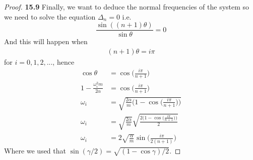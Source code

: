 \documentclass[11pt]{article}
\theoremstyle{definition}
\begin{document}
\begin{proof}{\textbf{15.9}}
    Finally, we want to deduce the normal frequencies of the system so we need
    to solve the equation $\Delta_n = 0$ i.e.
    $$\frac{\sin((n+1)\theta)}{\sin\theta} = 0$$
    And this will happen when
    \begin{align*}
        (n+1)\theta = i\pi
    \end{align*}
    for $i = 0,1,2,...$, hence
    \begin{align*}
        \cos\theta &= \cos\bigg(\frac{i\pi}{n+1}\bigg)\\
        1 - \frac{\omega_i^2m}{2\alpha} &= \cos\bigg(\frac{i\pi}{n+1}\bigg)\\
        \omega_i &= \sqrt{\frac{2\alpha}{m}\bigg(1 - \cos\bigg(\frac{i\pi}{n+1}\bigg)\bigg)}\\
        \omega_i &= \sqrt{\frac{2\alpha}{m}}
        \sqrt{\frac{2\bigg(1 - \cos\bigg(\frac{i\pi}{n+1}\bigg)\bigg)}{2}}\\
        \omega_i &= 2\sqrt{\frac{\alpha}{m}}\sin\bigg(\frac{i\pi}{2(n+1)}\bigg)
    \end{align*}
    Where we used that $\sin(\gamma/2) = \sqrt{(1- \cos\gamma)/2}$.
\end{proof}
\cleardoublepage
\end{document}
